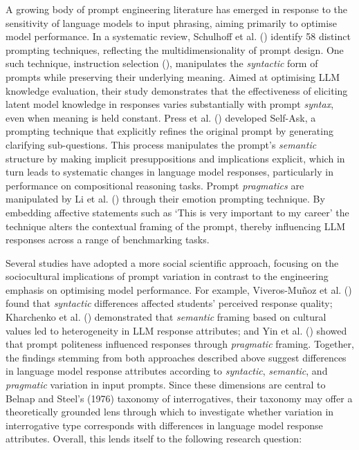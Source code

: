 \documentclass[
  12pt,
]{article}
\begin{document}
A growing body of prompt engineering literature has emerged in response to the sensitivity of language models to input phrasing, aiming primarily to optimise model performance. In a systematic review, Schulhoff et al. () identify 58 distinct prompting techniques, reflecting the multidimensionality of prompt design. One such technique, instruction selection (), manipulates the \emph{syntactic} form of prompts while preserving their underlying meaning. Aimed at optimising LLM knowledge evaluation, their study demonstrates that the effectiveness of eliciting latent model knowledge in responses varies substantially with prompt \emph{syntax}, even when meaning is held constant. Press et al. () developed Self-Ask, a prompting technique that explicitly refines the original prompt by generating clarifying sub-questions. This process manipulates the prompt's \emph{semantic} structure by making implicit presuppositions and implications explicit, which in turn leads to systematic changes in language model responses, particularly in performance on compositional reasoning tasks. Prompt \emph{pragmatics} are manipulated by Li et al. () through their emotion prompting technique. By embedding affective statements such as `This is very important to my career' the technique alters the contextual framing of the prompt, thereby influencing LLM responses across a range of benchmarking tasks.

Several studies have adopted a more social scientific approach, focusing on the sociocultural implications of prompt variation in contrast to the engineering emphasis on optimising model performance. For example, Viveros-Muñoz et al. () found that \emph{syntactic} differences affected students' perceived response quality; Kharchenko et al. () demonstrated that \emph{semantic} framing based on cultural values led to heterogeneity in LLM response attributes; and Yin et al. () showed that prompt politeness influenced responses through \emph{pragmatic} framing. Together, the findings stemming from both approaches described above suggest differences in language model response attributes according to \emph{syntactic}, \emph{semantic}, and \emph{pragmatic} variation in input prompts. Since these dimensions are central to Belnap and Steel's (1976) taxonomy of interrogatives, their taxonomy may offer a theoretically grounded lens through which to investigate whether variation in interrogative type corresponds with differences in language model response attributes. Overall, this lends itself to the following research question:
\end{document}
